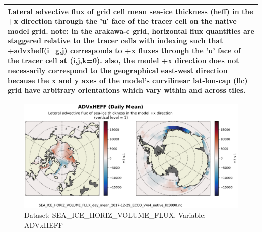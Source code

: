 \begin{longtable}{|m{}|m{}|m{}|m{}|}
\multicolumn{4}{|p{1\textwidth}|}{\footnotesize{{Lateral advective flux of grid cell mean sea-ice thickness (heff) in the +x direction through the 'u' face of the tracer cell on the native model grid. note: in the arakawa-c grid, horizontal flux quantities are staggered relative to the tracer cells with indexing such that +advxheff(i\_g,j) corresponds to +x fluxes through the 'u' face of the tracer cell at (i,j,k=0). also, the model +x direction does not necessarily correspond to the geographical east-west direction because the x and y axes of the model's curvilinear lat-lon-cap (llc) grid have arbitrary orientations which vary within and across tiles.}}} \\ \hline
\end{longtable}

\begin{figure}[H]
\centering
\includegraphics[scale=0.55]{../images/plots/native_plots/Sea-Ice_and_Snow_Horizontal_Volume_Fluxes/ADVxHEFF.png}
\caption{Dataset: SEA\_ICE\_HORIZ\_VOLUME\_FLUX, Variable: ADVxHEFF}
\label{tab:table-SEA_ICE_HORIZ_VOLUME_FLUX_ADVxHEFF-Plot}
\end{figure}
\newpage
\pagebreak
